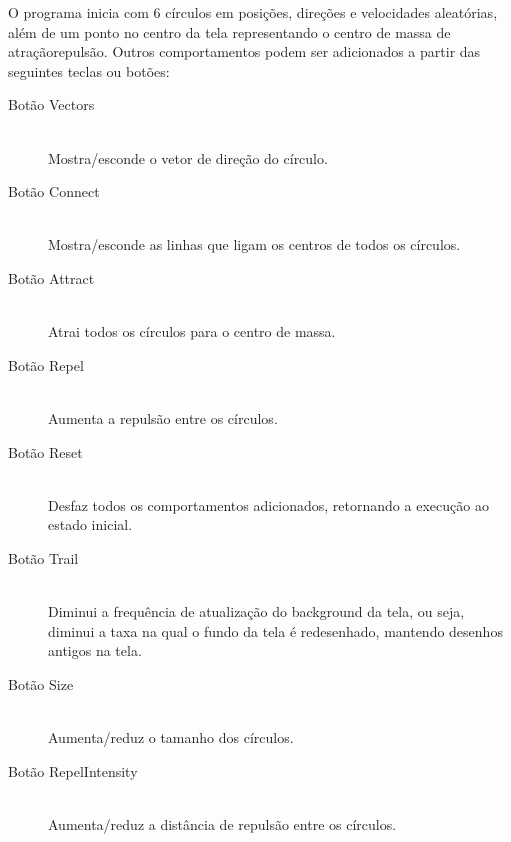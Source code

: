 \documentclass[12pt]{article}
\begin{document}
\vspace{0.4 true cm}
O programa inicia com 6 círculos em posições, direções e velocidades aleatórias, além de um ponto no centro da tela representando o centro de 
massa de atração\/repulsão. Outros comportamentos podem ser adicionados a partir das seguintes teclas ou botões:
\vspace{0.4 true cm}
\begin{description}

\item[Botão Vectors] \hfill \\
Mostra/esconde o vetor de direção do círculo.
\vspace{0.4 true cm}

\item[Botão Connect] \hfill \\
Mostra/esconde as linhas que ligam os centros de todos os círculos.
\vspace{0.4 true cm}

\item[Botão Attract] \hfill \\
Atrai todos os círculos para o centro de massa.
\vspace{0.4 true cm}

\item[Botão Repel] \hfill \\
Aumenta a repulsão entre os círculos.
\vspace{0.4 true cm}

\item[Botão Reset] \hfill \\
Desfaz todos os comportamentos adicionados, retornando a execução ao estado inicial.
\vspace{0.4 true cm}

\item[Botão Trail] \hfill \\
Diminui a frequência de atualização do background da tela, ou seja, diminui a taxa na qual o fundo da tela é redesenhado, 
mantendo desenhos antigos na tela.
\vspace{0.4 true cm}

\item[Botão Size] \hfill \\
Aumenta/reduz o tamanho dos círculos.
\vspace{0.4 true cm}

\item[Botão RepelIntensity] \hfill \\
Aumenta/reduz a distância de repulsão entre os círculos.
\vspace{0.4 true cm}


\end{description}
\end{document}
